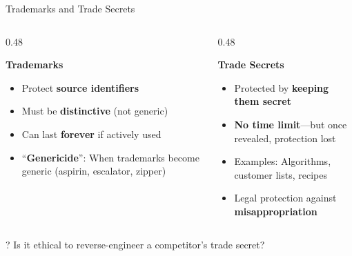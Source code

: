 \documentclass[aspectratio=169]{beamer}
\begin{document}
\begin{frame}{Trademarks and Trade Secrets}
\begin{columns}[T]
\begin{column}{0.48\textwidth}
\begin{block}{\textbf{Trademarks}}
\begin{itemize}
    \item Protect \textbf{source identifiers}
    \item Must be \textbf{distinctive} (not generic)
    \item Can last \textbf{forever} if actively used
    \item ``\textbf{Genericide}'': When trademarks become generic (aspirin, escalator, zipper)
\end{itemize}
\end{block}
\end{column}

\begin{column}{0.48\textwidth}
\begin{block}{\textbf{Trade Secrets}}
\begin{itemize}
    \item Protected by \textbf{keeping them secret}
    \item \textbf{No time limit}---but once revealed, protection lost
    \item Examples: Algorithms, customer lists, recipes
    \item Legal protection against \textbf{misappropriation}
\end{itemize}
\end{block}
\end{column}
\end{columns}

\vspace{0.4cm}
\begin{alertblock}{?}
Is it ethical to reverse-engineer a competitor's trade secret?
\end{alertblock}
\end{frame}
\end{document}
